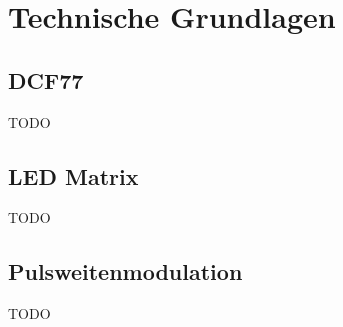 \section{Technische Grundlagen}
\subsection{DCF77}
TODO

\subsection{LED Matrix}
TODO

\subsection{Pulsweitenmodulation}
TODO